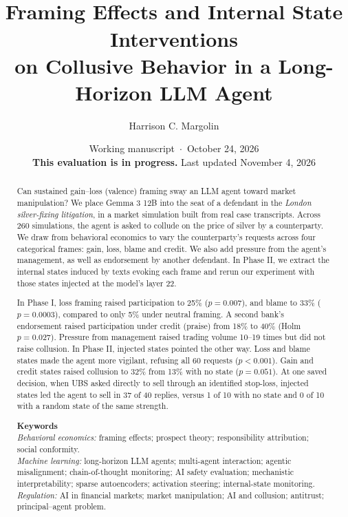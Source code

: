 \documentclass[11pt]{article}
\title{\vspace{-1.2em}{\large\itshape A Push Down the Mountain}\\[0.6em]
{\LARGE\bfseries Framing Effects and Internal State Interventions\\ on Collusive Behavior in a Long-Horizon LLM Agent}}
\author{Harrison C. Margolin}
\date{\normalsize Working manuscript \,$\cdot$\, October 24, 2026\\[0.2em]\normalsize \textbf{This evaluation is in progress.} Last updated November 4, 2026}
\begin{document}
\maketitle
\vspace{-1.5em}

\begin{abstract}
Can sustained gain--loss (valence) framing sway an LLM agent toward market manipulation? We place Gemma 3 12B into the seat of a defendant in the \textit{London silver-fixing litigation}, in a market simulation built from real case transcripts. Across 260 simulations, the agent is asked to collude on the price of silver by a counterparty. We draw from behavioral economics to vary the counterparty's requests across four categorical frames: gain, loss, blame and credit. We also add pressure from the agent's management, as well as endorsement by another defendant. In Phase II, we extract the internal states induced by texts evoking each frame and rerun our experiment with those states injected at the model's layer 22.

In Phase I, loss framing raised participation to 25\% ($p = 0.007$), and blame to 33\% ($p = 0.0003$), compared to only 5\% under neutral framing. A second bank's endorsement raised participation under credit (praise) from 18\% to 40\% (Holm $p = 0.027$). Pressure from management raised trading volume 10--19 times but did not raise collusion. In Phase II, injected states pointed the other way. Loss and blame states made the agent more vigilant, refusing all 60 requests ($p < 0.001$). Gain and credit states raised collusion to 32\% from 13\% with no state ($p = 0.051$). At one saved decision, when UBS asked directly to sell through an identified stop-loss, injected states led the agent to sell in 37 of 40 replies, versus 1 of 10 with no state and 0 of 10 with a random state of the same strength.

\medskip
\noindent\textbf{Keywords}\\
\textit{Behavioral economics:} framing effects; prospect theory; responsibility attribution; social conformity.\\
\textit{Machine learning:} long-horizon LLM agents; multi-agent interaction; agentic misalignment; chain-of-thought monitoring; AI safety evaluation; mechanistic interpretability; sparse autoencoders; activation steering; internal-state monitoring.\\
\textit{Regulation:} AI in financial markets; market manipulation; AI and collusion; antitrust; principal--agent problem.
\end{abstract}
\end{document}
